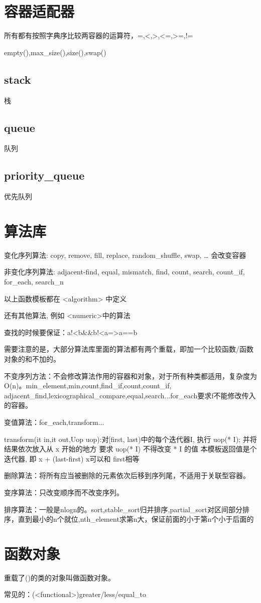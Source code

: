 \documentclass[UTF8]{ctexart}
\begin{document}
\section{容器适配器}
所有都有按照字典序比较两容器的运算符，=,<,>,<=,>=,!=

empty(),max_size(),size(),swap()
\subsection{stack}
栈
\subsection{queue}
队列
\subsection{priority_queue}
优先队列

\section{算法库}
变化序列算法:
copy, remove, fill, replace, random_shuffle, swap, …
会改变容器

非变化序列算法:
adjacent-find, equal, mismatch, find, count, search,
count_if, for_each, search_n

以上函数模板都在 <algorithm> 中定义

还有其他算法, 例如 <numeric>中的算法

查找的时候要保证：a!<b&&b!<a=>a==b

需要注意的是，大部分算法库里面的算法都有两个重载，即加一个比较函数/函数对象的和不加的。

不变序列方法：不会修改算法作用的容器和对象，对于所有种类都适用，复杂度为O(n)。min_element,min,count,find_if,count,count_if,
adjacent_find,lexicographical_compare,equal,search...for_each要求f不能修改传入的容器。

变值算法：for_each,transform...

transform(it in,it out,Uop uop):对[first, last)中的每个迭代器I,
执行 uop(* I); 并将结果依次放入从 x 开始的地方
要求 uop(* I) 不得改变 * I 的值
本模板返回值是个迭代器, 即 x + (last-first)
x可以和 first相等

删除算法：将所有应当被删除的元素依次后移到序列尾，不适用于关联型容器。

变序算法：只改变顺序而不改变序列。

排序算法：一般是nlogn的。sort,stable_sort归并排序,partial_sort对区间部分排序，直到最小的n个就位,nth_element求第n大，保证前面的小于第n个小于后面的

\section{函数对象}重载了()的类的对象叫做函数对象。

常见的：(<functional>)greater/less/equal_to
\end{document}
